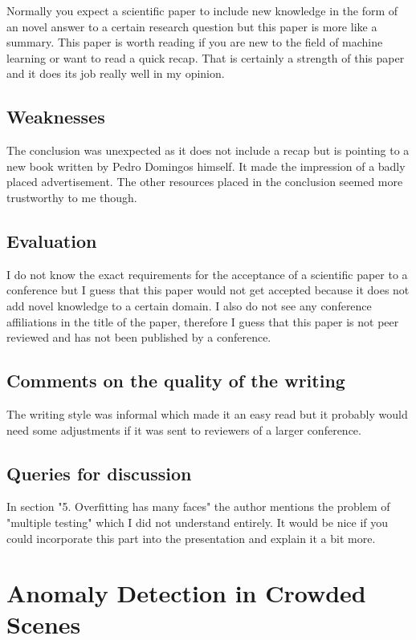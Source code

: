 \documentclass[a4paper]{article}
\begin{document}
Normally you expect a scientific paper to include new knowledge in the form of an novel answer to a certain research question but this paper is more like a summary. This paper is worth reading if you are new to the field of machine learning or want to read a quick recap. That is certainly a strength of this paper and it does its job really well in my opinion. 

\subsection{Weaknesses}

The conclusion was unexpected as it does not include a recap but is pointing to a new book written by Pedro Domingos himself. It made the impression of a badly placed advertisement. The other resources placed in the conclusion seemed more trustworthy to me though.

\subsection{Evaluation}

I do not know the exact requirements for the acceptance of a scientific paper to a conference but I guess that this paper would not get accepted because it does not add novel knowledge to a certain domain. I also do not see any conference affiliations in the title of the paper, therefore I guess that this paper is not peer reviewed and has not been published by a conference.

\subsection{Comments on the quality of the writing}

The writing style was informal which made it an easy read but it probably would need some adjustments if it was sent to reviewers of a larger conference.

\subsection{Queries for discussion}

In section "5. Overfitting has many faces" the author mentions the problem of "multiple testing" which I did not understand entirely. It would be nice if you could incorporate this part into the presentation and explain it a bit more. 


\section{Anomaly Detection in Crowded Scenes}
\end{document}

